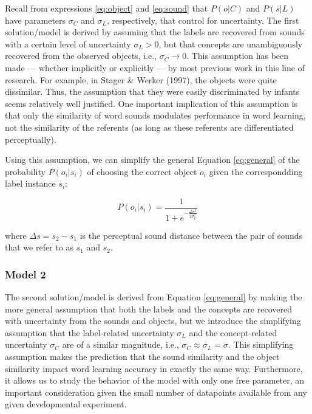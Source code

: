 \documentclass[english,,man]{apa6}
\begin{document}
Recall from expressions \ref{eq:object} and \ref{eq:sound} that \(P(o|C)\) and \(P(s|L)\) have parameters \(\sigma_C\) and \(\sigma_L\), respectively, that control for uncertainty. The first solution/model is derived by assuming that the labels are recovered from sounds with a certain level of uncertainty \(\sigma_L > 0\), but that concepts are unambiguously recovered from the observed objects, i.e., \(\sigma_C \rightarrow 0\). This assumption has been made --- whether implicitly or explicitly --- by most previous work in this line of research. For example, in Stager \& Werker (1997), the objects were quite dissimilar. Thus, the assumption that they were easily discriminated by infants seems relatively well justified. One important implication of this assumption is that only the similarity of word sounds modulates performance in word learning, not the similarity of the referents (as long as these referents are differentiated perceptually).

Using this assumption, we can simplify the general Equation \ref{eq:general} of the probability \(P(o_i | s_i)\) of choosing the correct object \(o_i\) given the correspondding label instance \(s_i\):

\begin{equation} \label{eq:model1}
P(o_i|s_i)= \frac{1}{1 + e^{-\frac{\Delta s^2}{2\sigma_L^2}}}
\end{equation}

where \(\Delta s = s_2-s_1\) is the perceptual sound distance between the pair of sounds that we refer to as \(s_1\) and \(s_2\).

\hypertarget{model-2}{%
\subsubsection{Model 2}\label{model-2}}

The second solution/model is derived from Equation \ref{eq:general} by making the more general assumption that both the labels and the concepts are recovered with uncertainty from the sounds and objects, but we introduce the simplifying assumption that the label-related uncertainty \(\sigma_L\) and the concept-related uncertainty \(\sigma_C\) are of a similar magnitude, i.e., \(\sigma_C \approx \sigma_L = \sigma\). This simplifying assumption makes the prediction that the sound similarity and the object similarity impact word learning accuracy in exactly the same way. Furthermore, it allows us to study the behavior of the model with only one free parameter, an important consideration given the small number of datapoints available from any given developmental experiment.
\end{document}
